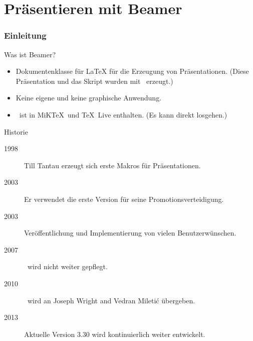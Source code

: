 \malte

\label{chapter-beamer}
\chapter{Präsentieren mit Beamer}


\website

\jonny


\subsection{Einleitung}

\begin{Frame}{Was ist Beamer?}
  \begin{itemize}
    \item \alert{Dokumentenklasse für \LaTeX} für die Erzeugung von Präsentationen.\newline
      (Diese Präsentation und das Skript wurden mit \beamer\ erzeugt.)
    \item Keine eigene und \alert{keine graphische Anwendung}.
    \item \beamer\ ist in MiK\TeX\ und \TeX\ Live enthalten.\newline
      (\alert{Es kann direkt losgehen}.)
  \end{itemize}
\end{Frame}

\begin{Frame}{Historie}
  \begin{description}
    \item[1998] Till Tantau erzeugt sich erste Makros für Präsentationen.
    \item[2003] Er verwendet die erste Version für seine Promotionsverteidigung.
    \item[2003] Veröffentlichung und Implementierung von vielen Benutzerwünschen.
    \item[2007] \beamer\ wird nicht weiter gepflegt.
    \item[2010] \beamer\ wird an Joseph Wright and Vedran Mileti\'c übergeben.
    \item[2013] Aktuelle Version 3.30 wird kontinuierlich weiter entwickelt.
  \end{description}
\end{Frame}

